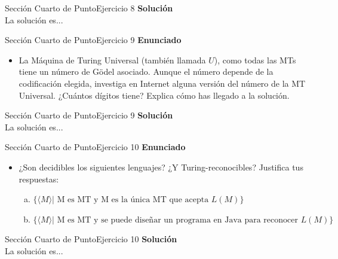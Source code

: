 \documentclass[10pt, envcountsect, presentation, aspectratio=169]{beamer}
\begin{document}

\begin{frame}{Sección Cuarto de Punto}{Ejercicio 8}
    \textbf{Solución}\\
    La solución es...
\end{frame}


\begin{frame}{Sección Cuarto de Punto}{Ejercicio 9}
    \textbf{Enunciado}
    \begin{itemize}
        \item La Máquina de Turing Universal (también llamada $U$), como todas las MTs tiene un número de Gödel asociado. Aunque el número depende de la codificación elegida, investiga en Internet alguna versión del número de la MT Universal. ¿Cuántos  dígitos tiene? Explica cómo has llegado a la solución.
    \end{itemize}
\end{frame}


\begin{frame}{Sección Cuarto de Punto}{Ejercicio 9}
    \textbf{Solución}\\
    La solución es...
\end{frame}


\begin{frame}{Sección Cuarto de Punto}{Ejercicio 10}
    \textbf{Enunciado}
    \begin{itemize}
        \item ¿Son decidibles los siguientes lenguajes? ¿Y Turing-reconocibles? Justifica tus respuestas:
        \begin{enumerate}[a)]
            \item  $\{\langle M \rangle \mbox{| M es MT y  M es la única MT que acepta } L(M)\}$ 
            \item $\{\langle M \rangle \mbox{| M es MT  y  se puede diseñar un programa en Java para reconocer } L(M)\}$
        \end{enumerate}
    \end{itemize}
\end{frame}


\begin{frame}{Sección Cuarto de Punto}{Ejercicio 10}
    \textbf{Solución}\\
    La solución es...
\end{frame}
\end{document}

